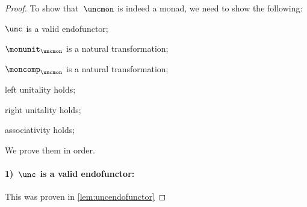 \begin{proof}
  To show that~$\uncmon$ is indeed a monad, we need to show the following:
  \begin{compactenum}
    \item $\unc$ is a valid endofunctor;
    \item $\monunit_{\uncmon}$ is a natural transformation;
    \item $\moncomp_{\uncmon}$ is a natural transformation;
    \item left unitality holds;
    \item right unitality holds;
    \item associativity holds;
  \end{compactenum}
  We prove them in order.

  \paragraph*{1)~$\unc$ is a valid endofunctor:} This was proven in \cref{lem:uncendofunctor}


\end{proof}
